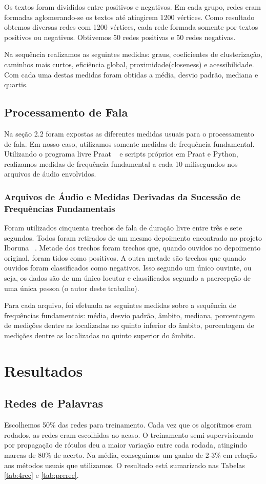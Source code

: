 \documentclass[12pt]{article}
\begin{document}
Os textos foram divididos entre positivos e negativos. Em cada grupo, redes eram formadas aglomerando-se os textos até atingirem 1200 vértices. Como resultado obtemos diversas redes com 1200 vértices, cada rede formada somente por textos positivos ou negativos. Obtivemos 50 redes positivas e 50 redes negativas.

Na sequência realizamos as seguintes medidas: graus, coeficientes de clusterização, caminhos mais curtos, eficiência global, proximidade(closeness) e acessibilidade. Com cada uma destas medidas foram obtidas a média, desvio padrão, mediana e quartis.


\subsection{Processamento de Fala}
Na seção 2.2 foram expostas as diferentes medidas usuais para o processamento de fala. Em nosso caso, utilizamos somente medidas de frequência fundamental. Utilizando o programa livre Praat ~\cite{praat} e scripts próprios em Praat e Python, realizamos medidas de frequência fundamental a cada 10 milisegundos nos arquivos de áudio envolvidos.

\subsubsection{Arquivos de Áudio e Medidas Derivadas da Sucessão de Frequências Fundamentais}
Foram utilizados cinquenta trechos de fala de duração livre entre três e sete segundos. Todos foram retirados de um mesmo depoimento encontrado no projeto Iboruna ~\cite{iboruna}. Metade dos trechos foram trechos que, quando ouvidos no depoimento original, foram tidos como positivos. A outra metade são trechos que quando ouvidos foram classificados como negativos. Isso segundo um único ouvinte, ou seja, os dados são de um único locutor e classificados segundo a paercepção de uma única pessoa (o autor deste trabalho).

Para cada arquivo, foi efetuada as seguintes medidas sobre a sequência de frequências fundamentais: média, desvio padrão, âmbito, mediana, porcentagem de medições dentre as localizadas no quinto inferior do âmbito, porcentagem de medições dentre as localizadas no quinto superior do âmbito.

\section{Resultados}
\subsection{Redes de Palavras}
Escolhemos 50\% das redes para treinamento. Cada vez que os algorítmos eram rodados, as redes eram escolhidas ao acaso. O treinamento semi-supervisionado por propagação de rótulos deu a maior variação entre cada rodada, atingindo marcas de 80\% de acerto. Na média, conseguimos um ganho de 2-3\% em relação aos métodos usuais que utilizamos. O resultado está sumarizado nas Tabelas \ref{tab:4rec} e \ref{tab:prerec}. 
\end{document}

